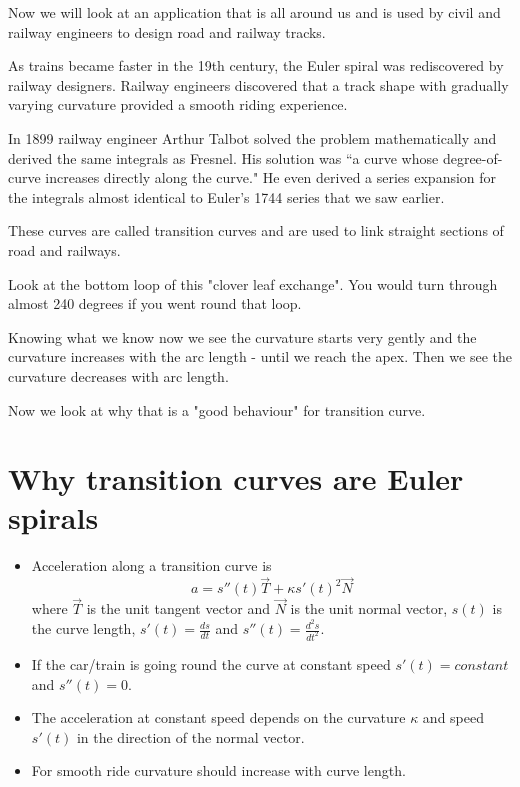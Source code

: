 \documentclass[]{article} %
\theoremstyle{definition}
\theoremstyle{theorem}
\begin{document}
Now we will look at an application that is all around us and is used by civil and railway engineers to design road and railway tracks.
 
As trains became faster in the 19th century, the Euler spiral was rediscovered by railway designers. Railway engineers discovered that a track shape with gradually varying curvature provided a smooth riding experience.

In 1899 railway engineer Arthur Talbot solved the problem mathematically and derived the same integrals as Fresnel. His solution was ``a curve whose degree-of-curve increases directly along the curve." He even derived a series expansion for the integrals almost identical to Euler's 1744 series that we saw earlier.

These curves are called transition curves and are used to link straight sections of road and railways.

Look at the bottom loop of this "clover leaf exchange". You would turn through almost 240 degrees if you went round that loop. 

Knowing what we know now we see the curvature starts very gently and the curvature increases with the arc length - until we reach the apex. Then we see the curvature decreases with arc length.

Now we look at why that is a "good behaviour" for transition curve.


\section{Why transition curves are Euler spirals}
\begin{tcolorbox}
	\begin{itemize}
	\item Acceleration along a transition curve is
 	 \[
 	 a=s''(t) \vec{T}+\kappa s'(t)^2 \vec{N}
 	 \]
 	 where $\vec{T}$ is the unit tangent vector and $\vec{N}$ is the unit normal vector, $s(t)$ is the curve length, $s'(t) = \frac{ds}{dt}$ and $s''(t) = \frac{d^2 s}{dt^2}$.
 	 \item If the car/train is going round the curve at constant speed $s'(t)=constant$ and $s''(t)=0$.	
 	 \item The acceleration at constant speed depends on the curvature $\kappa$ and speed $s'(t)$ in the direction of the normal vector.
 	 \item For smooth ride curvature should increase with curve length.
	\end{itemize}
\end{tcolorbox}
\end{document}
